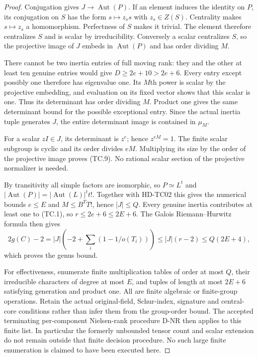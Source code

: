 \begin{proof}
Conjugation gives $J\to\operatorname{Aut}(P)$.
If an element induces the identity on $P$, its conjugation
on $S$ has the form $s\mapsto z_s s$ with $z_s\in Z(S)$.
Centrality makes $s\mapsto z_s$ a homomorphism. Perfectness
of $S$ makes it trivial. The element therefore centralizes
$S$ and is scalar by irreducibility. Conversely a scalar
centralizes $S$, so the projective image of $J$ embeds in
$\operatorname{Aut}(P)$ and has order dividing $M$.

There cannot be two inertia entries of full moving rank:
they and the other at least ten genuine entries would
give $D\ge2e+10>2e+6$. Every entry except possibly one
therefore has eigenvalue one. Its $M$th power is scalar
by the projective embedding, and evaluation on its fixed
vector shows that this scalar is one. Thus its determinant
has order dividing $M$. Product one gives the same
determinant bound for the possible exceptional entry.
Since the actual inertia tuple generates $J$, the entire
determinant image is contained in $\mu_M$.

For a scalar $zI\in J$, its determinant is $z^e$; hence
$z^{eM}=1$. The finite scalar subgroup is cyclic and its
order divides $eM$. Multiplying its size by the order of
the projective image proves (TC.9). No rational scalar
section of the projective normalizer is needed.

By transitivity all simple factors are isomorphic, so
$P\simeq L^t$ and
$|\operatorname{Aut}(P)|=|\operatorname{Aut}(L)|^t t!$.
Together with HD-TC02 this gives the numerical bounds
$e\le E$ and $M\le B^T T!$, hence $|J|\le Q$.
Every genuine inertia contributes at least one to (TC.1),
so $r\le2e+6\le2E+6$. The Galois Riemann--Hurwitz formula
then gives
\[
 2g(C)-2=|J|\left(-2+\sum_i(1-1/o(T_i))\right)
              \le |J|(r-2)\le Q(2E+4),                  \tag{TC.12}
\]
which proves the genus bound.

For effectiveness, enumerate finite multiplication tables
of order at most $Q$, their irreducible characters of degree
at most $E$, and tuples of length at most $2E+6$ satisfying
generation and product one. All are finite algebraic or
finite-group operations. Retain the actual original-field,
Schur-index, signature and central-core conditions rather
than infer them from the group-order bound. The accepted
terminating per-component Nielsen-rank procedure D-NR
then applies to this finite list. In particular the formerly
unbounded tensor count and scalar extension do not remain
outside that finite decision procedure. No such large finite
enumeration is claimed to have been executed here.
\end{proof}

